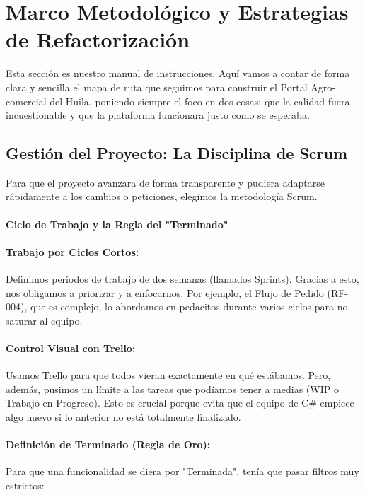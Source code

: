 \section{Marco Metodológico y Estrategias de Refactorización}

Esta sección es nuestro manual de instrucciones. Aquí vamos a contar de forma clara y sencilla el mapa de ruta que seguimos para construir el Portal Agro-comercial del Huila, poniendo siempre el foco en dos cosas: que la calidad fuera incuestionable y que la plataforma funcionara justo como se esperaba.

\subsection{Gestión del Proyecto: La Disciplina de Scrum}

Para que el proyecto avanzara de forma transparente y pudiera adaptarse rápidamente a los cambios o peticiones, elegimos la metodología Scrum.

\paragraph{Ciclo de Trabajo y la Regla del "Terminado"}

\paragraph{Trabajo por Ciclos Cortos:} Definimos periodos de trabajo de dos semanas (llamados Sprints). Gracias a esto, nos obligamos a priorizar y a enfocarnos. Por ejemplo, el Flujo de Pedido (RF-004), que es complejo, lo abordamos en pedacitos durante varios ciclos para no saturar al equipo.

\paragraph{Control Visual con Trello:} Usamos Trello para que todos vieran exactamente en qué estábamos. Pero, además, pusimos un límite a las tareas que podíamos tener a medias (WIP o Trabajo en Progreso). Esto es crucial porque evita que el equipo de C\# empiece algo nuevo si lo anterior no está totalmente finalizado.

\paragraph{Definición de Terminado (Regla de Oro):} Para que una funcionalidad se diera por "Terminada", tenía que pasar filtros muy estrictos:

